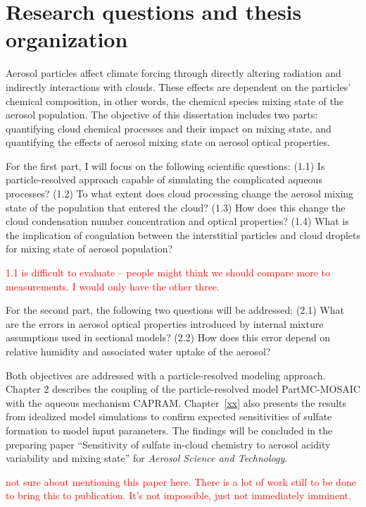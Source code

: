 \documentclass[edeposit,fullpage]{uiucthesis2009}
\begin{document}
\section{Research questions and thesis organization}
Aerosol particles affect climate forcing through directly altering
radiation and indirectly interactions with clouds. These effects are
dependent on the particles' chemical composition, in other words, the
chemical species mixing state of the aerosol population. The objective
of this dissertation includes two parts: quantifying cloud chemical
processes and their impact on mixing state, and quantifying the
effects of aerosol mixing state on aerosol optical properties. 

For the first part, I will focus on the following scientific
questions: (1.1) Is particle-resolved approach capable of simulating
the complicated aqueous processes? (1.2) To what extent does cloud
processing change the aerosol mixing state of the population that
entered the cloud?  (1.3) How does this change the cloud condensation
number concentration and optical properties? (1.4) What is the
implication of coagulation between the interstitial particles and
cloud droplets for mixing state of aerosol population?

\textcolor{red}{1.1 is difficult to evaluate -- people might think we
  should compare more to measurements. I would only have the other
  three.}

For the second part, the following two questions will be addressed:
(2.1) What are the errors in aerosol optical properties introduced by
internal mixture assumptions used in sectional models? (2.2) How does
this error depend on relative humidity and associated water uptake of
the aerosol?

Both objectives are addressed with a particle-resolved modeling
approach. Chapter 2 describes the coupling of the particle-resolved
model PartMC-MOSAIC with the aqueous mechanism
CAPRAM. Chapter~\ref{xx} also presents the results from idealized
model simulations to confirm expected sensitivities of sulfate
formation to model input parameters. The findings will be concluded in
the preparing paper ``Sensitivity of sulfate in-cloud chemistry to
aerosol acidity variability and mixing state'' for \textit{Aerosol
  Science and Technology}.

\textcolor{red}{not sure about mentioning this paper here. There is a
  lot of work still to be done to bring this to publication. It's not
  impossible, just not immediately imminent.}
\end{document}
